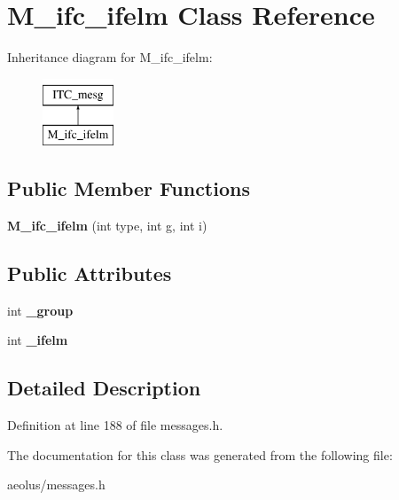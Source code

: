 \hypertarget{class_m__ifc__ifelm}{}\section{M\+\_\+ifc\+\_\+ifelm Class Reference}
\label{class_m__ifc__ifelm}
Inheritance diagram for M\+\_\+ifc\+\_\+ifelm\+:\begin{figure}[H]
\begin{center}
\leavevmode
\includegraphics[height=2.000000cm]{class_m__ifc__ifelm}
\end{center}
\end{figure}
\subsection*{Public Member Functions}
\begin{DoxyCompactItemize}
\item 
\mbox{\label{class_m__ifc__ifelm_a1bc0f47a062605593608a31ac0eb97ce}} 
{\bfseries M\+\_\+ifc\+\_\+ifelm} (int type, int g, int i)
\end{DoxyCompactItemize}
\subsection*{Public Attributes}
\begin{DoxyCompactItemize}
\item 
\mbox{\label{class_m__ifc__ifelm_a0fe555b8ccf8516b648e96f916e37ba4}} 
int {\bfseries \+\_\+group}
\item 
\mbox{\label{class_m__ifc__ifelm_af35af33ff9ea558f0a882400484c0841}} 
int {\bfseries \+\_\+ifelm}
\end{DoxyCompactItemize}


\subsection{Detailed Description}


Definition at line 188 of file messages.\+h.



The documentation for this class was generated from the following file\+:\begin{DoxyCompactItemize}
\item 
aeolus/messages.\+h\end{DoxyCompactItemize}
